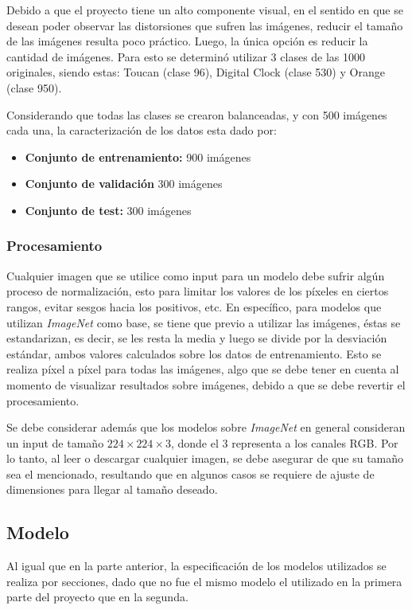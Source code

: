 \documentclass[conference]{IEEEtran}
\begin{document}
Debido a que el proyecto tiene un alto componente visual, en el sentido en que se desean poder observar las distorsiones que sufren las imágenes, reducir el tamaño de las imágenes resulta poco práctico. Luego, la única opción es reducir la cantidad de imágenes. Para esto se determinó utilizar 3 clases de las 1000 originales, siendo estas: Toucan (clase 96), Digital Clock (clase 530) y Orange (clase 950).

Considerando que todas las clases se crearon balanceadas, y con 500 imágenes cada una, la caracterización de los datos esta dado por:

\begin{itemize}
    \item \textbf{Conjunto de entrenamiento:}  900 imágenes
    \item \textbf{Conjunto de validación} 300 imágenes
    \item \textbf{Conjunto de test:} 300 imágenes
\end{itemize}

\subsubsection{Procesamiento}
Cualquier imagen que se utilice como input para un modelo debe sufrir algún proceso de normalización, esto para limitar los valores de los píxeles en ciertos rangos, evitar sesgos hacia los positivos, etc. En específico, para modelos que utilizan \textit{ImageNet} como base, se tiene que previo a utilizar las imágenes, éstas se estandarizan, es decir, se les resta la media y luego se divide por la desviación estándar, ambos valores calculados sobre los datos de entrenamiento. Esto se realiza píxel a píxel para todas las imágenes, algo que se debe tener en cuenta al momento de visualizar resultados sobre imágenes, debido a que se debe revertir el procesamiento. 

Se debe considerar además que los modelos sobre \textit{ImageNet} en general consideran un input de tamaño $224 \times 224 \times 3$, donde el 3 representa a los canales RGB. Por lo tanto, al leer o descargar cualquier imagen, se debe asegurar de que su tamaño sea el mencionado, resultando que en algunos casos se requiere de ajuste de dimensiones para llegar al tamaño deseado.

\subsection{Modelo}
Al igual que en la parte anterior, la especificación de los modelos utilizados se realiza por secciones, dado que no fue el mismo modelo el utilizado en la primera parte del proyecto que en la segunda. 
\end{document}
